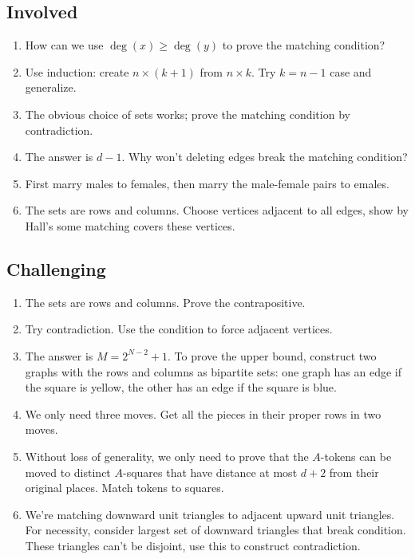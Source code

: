 \documentclass[11pt,paper=letter]{scrartcl}
\begin{document}
\subsection{Involved}

\begin{enumerate}

\item How can we use $\deg(x) \geq \deg(y)$ to prove the matching condition?

\item Use induction: create $n \times (k + 1)$ from $n \times k$. Try $k = n-1$ case and generalize.

\item The obvious choice of sets works; prove the matching condition by contradiction.

\item The answer is $d-1$. Why won't deleting edges break the matching condition?

\item First marry males to females, then marry the male-female pairs to emales.

\item The sets are rows and columns. Choose vertices adjacent to all edges, show by Hall's some matching covers these vertices.

\end{enumerate}

\subsection{Challenging}

\begin{enumerate}

\item The sets are rows and columns. Prove the contrapositive.

\item Try contradiction. Use the condition to force adjacent vertices.

\item The answer is $M = 2^{N-2} + 1$. To prove the upper bound, construct two graphs with the rows and columns as bipartite sets: one graph has an edge if the square is yellow, the other has an edge if the square is blue.

\item We only need three moves. Get all the pieces in their proper rows in two moves.

\item Without loss of generality, we only need to prove that the $A$-tokens can be moved to distinct $A$-squares that have distance at most $d+2$ from their original places. Match tokens to squares.

\item We're matching downward unit triangles to adjacent upward unit triangles. For necessity, consider largest set of downward triangles that break condition. These triangles can't be disjoint, use this to construct contradiction.

\end{enumerate}
\end{document}
